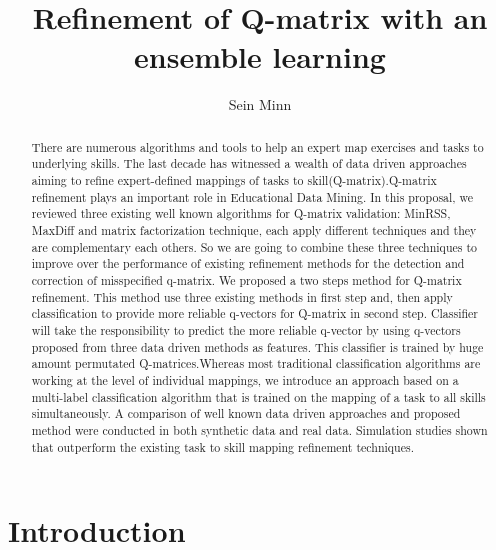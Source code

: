\documentclass[11pt]{article}
\begin{document}
\title{Refinement of Q-matrix with an ensemble learning}
\author{Sein Minn}
\maketitle
\setlength{\parindent}{15pt}



\begin{abstract}
There are numerous algorithms and tools to help an expert map exercises and tasks to underlying skills. The last decade has witnessed a wealth of data driven approaches aiming to refine expert-defined
mappings of tasks to skill(Q-matrix).Q-matrix refinement plays an important role in Educational Data Mining. In this proposal, we reviewed three existing well known algorithms for Q-matrix validation: MinRSS, MaxDiff and matrix factorization technique, each apply different techniques and they are complementary each others.  So we are going to combine these three techniques to improve over the performance of existing refinement methods for the detection and correction of misspecified q-matrix. We proposed a two steps method for Q-matrix refinement. This method use three existing methods in first step and, then apply classification to provide more reliable q-vectors for Q-matrix in second step. Classifier will take the responsibility to predict the more reliable q-vector by using q-vectors proposed from three data driven methods as features. This classifier is trained by huge amount permutated Q-matrices.Whereas most traditional classification algorithms are working at the level of individual mappings, we introduce an approach based on a multi-label classification algorithm that is trained on the mapping of a task to all skills simultaneously. A comparison of well known data driven approaches and proposed method were conducted in both synthetic data and real data. Simulation studies shown that outperform the existing task to skill mapping refinement techniques.
\end{abstract}

\section{Introduction}
\end{document}

